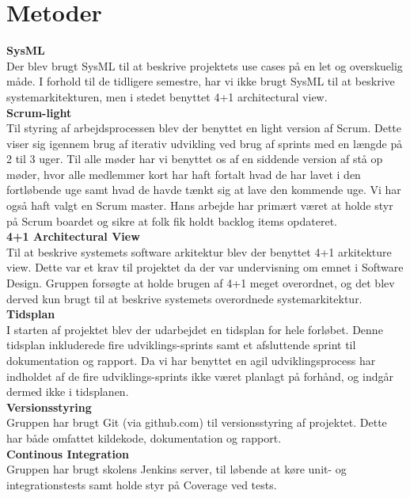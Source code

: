 \section{Metoder}

\textbf{SysML}\\
Der blev brugt SysML til at beskrive projektets use cases på en let og overskuelig måde. I forhold til de tidligere semestre, har vi ikke brugt SysML til at beskrive systemarkitekturen, men i stedet benyttet 4+1 architectural view.\\

\textbf{Scrum-light}\\
Til styring af arbejdsprocessen blev der benyttet en light version af Scrum. Dette viser sig igennem brug af iterativ udvikling ved brug af sprints med en længde på 2 til 3 uger. Til alle møder har vi benyttet os af en siddende version af stå op møder, hvor alle medlemmer kort har haft fortalt hvad de har lavet i den fortløbende uge samt hvad de havde tænkt sig at lave den kommende uge. Vi har også haft valgt en Scrum master. Hans arbejde har primært været at holde styr på Scrum boardet og sikre at folk fik holdt backlog items opdateret.\\

\textbf{4+1 Architectural View} \\
Til at beskrive systemets software arkitektur blev der benyttet 4+1 arkitekture view. Dette var et krav til projektet da der var undervisning om emnet i Software Design. Gruppen forsøgte at holde brugen af 4+1 meget overordnet, og det blev derved kun brugt til at beskrive systemets overordnede systemarkitektur. \\

\textbf{Tidsplan} \\
I starten af projektet blev der udarbejdet en tidsplan for hele forløbet. Denne tidsplan inkluderede fire udviklings-sprints samt et afsluttende sprint til dokumentation og rapport. Da vi har benyttet en agil udviklingsprocess har indholdet af de fire udviklings-sprints ikke været planlagt på forhånd, og indgår dermed ikke i tidsplanen. \\

\textbf{Versionsstyring} \\
Gruppen har brugt Git (via github.com) til versionsstyring af projektet. Dette har både omfattet kildekode, dokumentation og rapport. \\

\textbf{Continous Integration} \\
Gruppen har brugt skolens Jenkins server, til løbende at køre unit- og integrationstests samt holde styr på Coverage ved tests. \\
